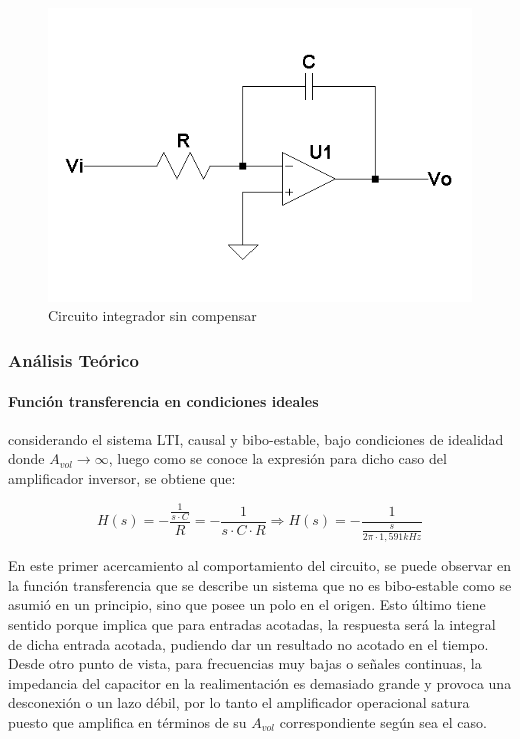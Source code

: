 \begin{figure}[H]
	\centering
	\includegraphics[scale=0.8]{Recursos/Integrador/Circuito_integrador.png}
	\caption{Circuito integrador sin compensar}
	\label{fig:circuito_integrador}
\end{figure}
\subsubsection{An\'alisis Te\'orico}

\paragraph*{Funci\'on transferencia en condiciones ideales} considerando el sistema LTI, causal y bibo-estable, bajo condiciones de idealidad donde $A_{vol} \rightarrow \infty$, luego como se conoce la expresi\'on para dicho caso del amplificador inversor, se obtiene que:

\begin{equation}
	H(s) = - \frac{\frac{1}{s \cdot C}}{R} = - \frac{1}{s \cdot C \cdot R}
	\Rightarrow
	H(s) = - \frac{1}{\frac{s}{2 \pi \cdot 1,591kHz}}
	\label{eq:integrador_transfer_ideal}
\end{equation}

En este primer acercamiento al comportamiento del circuito, se puede observar en la funci\'on transferencia que se describe un sistema que no es bibo-estable como se asumi\'o en un principio, sino que posee un polo en el origen. Esto \'ultimo tiene sentido porque implica que para entradas acotadas, la respuesta ser\'a la integral de dicha entrada acotada, pudiendo dar un resultado no acotado en el tiempo. Desde otro punto de vista, para frecuencias muy bajas o se\~nales continuas, la impedancia del capacitor en la realimentaci\'on es demasiado grande y provoca una desconexi\'on o un lazo d\'ebil, por lo tanto el amplificador operacional satura puesto que amplifica en t\'erminos de su $A_{vol}$ correspondiente seg\'un sea el caso.

